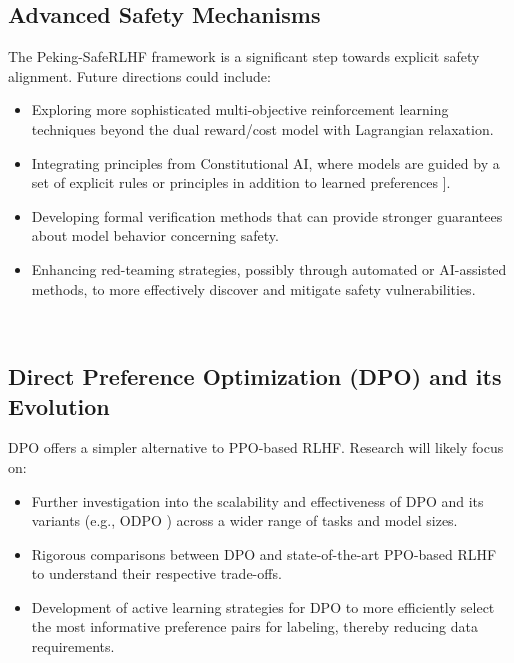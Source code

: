 \documentclass[10pt,journal,compsoc]{IEEEtran} %
\begin{document}
\subsection{Advanced Safety Mechanisms}
The Peking-SafeRLHF framework  is a significant step towards explicit safety alignment. Future directions could include:
\begin{itemize}
\item Exploring more sophisticated multi-objective reinforcement learning techniques beyond the dual reward/cost model with Lagrangian relaxation.
\item Integrating principles from Constitutional AI, where models are guided by a set of explicit rules or principles in addition to learned preferences ].
\item Developing formal verification methods that can provide stronger guarantees about model behavior concerning safety.
\item Enhancing red-teaming strategies, possibly through automated or AI-assisted methods, to more effectively discover and mitigate safety vulnerabilities.
\end{itemize}  

\subsection{Direct Preference Optimization (DPO) and its Evolution}
DPO offers a simpler alternative to PPO-based RLHF. Research will likely focus on:
\begin{itemize}
\item Further investigation into the scalability and effectiveness of DPO and its variants (e.g., ODPO ) across a wider range of tasks and model sizes.
\item Rigorous comparisons between DPO and state-of-the-art PPO-based RLHF to understand their respective trade-offs.
\item Development of active learning strategies for DPO to more efficiently select the most informative preference pairs for labeling, thereby reducing data requirements.
\end{itemize}  
\end{document}
